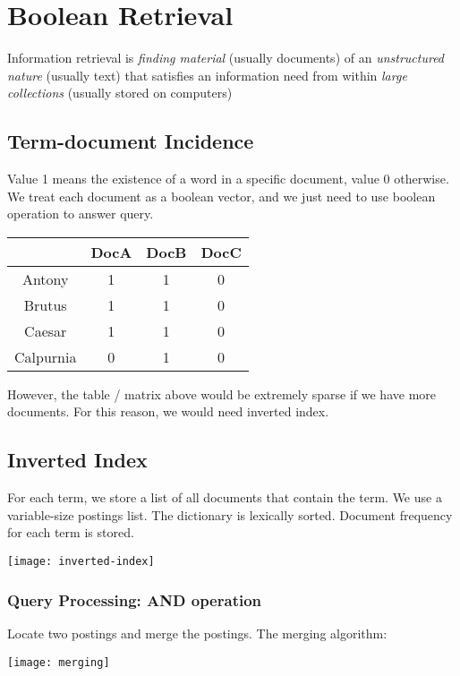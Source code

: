 \chapter{Boolean Retrieval}

\begin{multicols*}{2}

\noindent Information retrieval is \textit{finding material} (usually documents) of an \textit{unstructured nature} (usually text) that satisfies an information need from within \textit{large collections} (usually stored on computers)

\section{Term-document Incidence}
\noindent Value 1 means the existence of a word in a specific document, value 0 otherwise. We treat each document as a boolean vector, and we just need to use boolean operation to answer query. 

\begin{center}
\begin{tabular}{ |c|c|c|c| } 
    \hline
     & DocA & DocB & DocC \\
    \hline 
    Antony & 1 & 1 & 0 \\ 
    Brutus & 1 & 1 & 0 \\
    Caesar & 1 & 1 & 0 \\
    Calpurnia & 0 & 1 & 0 \\ 
    \hline
\end{tabular}
\end{center}

\noindent However, the table / matrix above would be extremely sparse if we have more documents. For this reason, we would need inverted index.

\section{Inverted Index}
\noindent For each term, we store a list of all documents that contain the term. We use a variable-size postings list. The dictionary is lexically sorted. Document frequency for each term is stored.

\begin{center}
\texttt{[image: inverted-index]}
\end{center}

\subsection{Query Processing: AND operation}
Locate two postings and merge the postings. The merging algorithm:
\begin{center}
\texttt{[image: merging]}
\end{center}


\end{multicols*}

